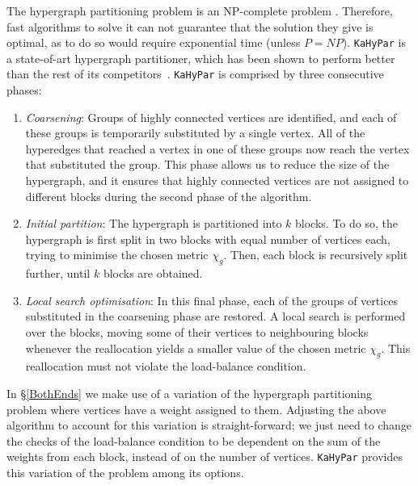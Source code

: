 The hypergraph partitioning problem is an NP-complete problem \citep{NP-complete}. Therefore, fast algorithms to solve it can not guarantee that the solution they give is optimal, as to do so would require exponential time (unless \(P = NP\)). \texttt{KaHyPar} is a state-of-art hypergraph partitioner, which has been shown to perform better than the rest of its competitors~\citep{KaHyPar}. \texttt{KaHyPar} is comprised by three consecutive phases:

\begin{enumerate}
  \item \textit{Coarsening}: Groups of highly connected vertices are identified, and each of these groups is temporarily substituted by a single vertex. All of the hyperedges that reached a vertex in one of these groups now reach the vertex that substituted the group. This phase allows us to reduce the size of the hypergraph, and it ensures that highly connected vertices are not assigned to different blocks during the second phase of the algorithm.
  \item \textit{Initial partition}: The hypergraph is partitioned into \(k\) blocks. To do so, the hypergraph is first split in two blocks with equal number of vertices each, trying to minimise the chosen metric \(\chi_g\). Then, each block is recursively split further, until \(k\) blocks are obtained.
  \item \textit{Local search optimisation}: In this final phase, each of the groups of vertices substituted in the coarsening phase are restored. A local search is performed over the blocks, moving some of their vertices to neighbouring blocks whenever the reallocation yields a smaller value of the chosen metric \(\chi_g\). This reallocation must not violate the load-balance condition.
\end{enumerate}

In \S\ref{BothEnds} we make use of a variation of the hypergraph partitioning problem where vertices have a weight assigned to them. Adjusting the above algorithm to account for this variation is straight-forward; we just need to change the checks of the load-balance condition to be dependent on the sum of the weights from each block, instead of on the number of vertices. \texttt{KaHyPar} provides this variation of the problem among its options.
